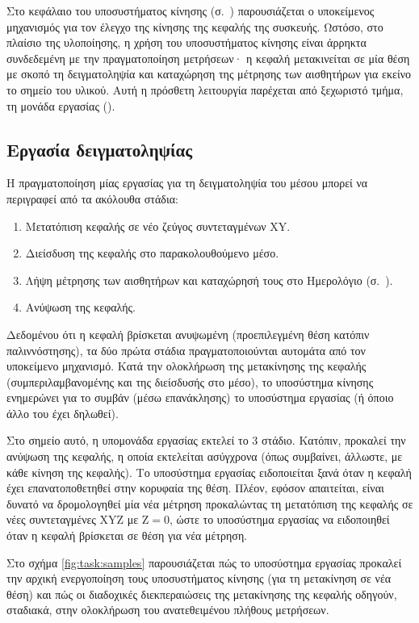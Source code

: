 Στο κεφάλαιο του υποσυστήματος κίνησης (σ.~\pageref{ch:motor})
παρουσιάζεται ο υποκείμενος μηχανισμός για τον έλεγχο της κίνησης της κεφαλής
της συσκευής.
Ωστόσο, στο πλαίσιο της υλοποίησης, η χρήση του υποσυστήματος κίνησης είναι
άρρηκτα συνδεδεμένη με την πραγματοποίηση μετρήσεων· η κεφαλή μετακινείται σε
μία
θέση με σκοπό τη δειγματοληψία και καταχώρηση της μέτρησης των αισθητήρων για
εκείνο το σημείο του υλικού. Αυτή η πρόσθετη λειτουργία παρέχεται από ξεχωριστό
τμήμα, τη μονάδα εργασίας ().


\subsection{Εργασία δειγματοληψίας}

Η πραγματοποίηση μίας εργασίας για τη δειγματοληψία του μέσου μπορεί να
περιγραφεί από τα ακόλουθα στάδια:
\begin{enumerate}
    \item Μετατόπιση κεφαλής σε νέο ζεύγος συντεταγμένων XY.
    \item Διείσδυση της κεφαλής στο παρακολουθούμενο μέσο.
    \item Λήψη μέτρησης των αισθητήρων και καταχώρησή τους στο Ημερολόγιο
    (σ.~\pageref{sec:log}).
    \item Ανύψωση της κεφαλής.
\end{enumerate}

Δεδομένου ότι η κεφαλή βρίσκεται ανυψωμένη (προεπιλεγμένη θέση κατόπιν
παλιννόστησης), %
τα δύο πρώτα στάδια πραγματοποιούνται αυτομάτα από τον
υποκείμενο μηχανισμό. Κατά την ολοκλήρωση της μετακίνησης της κεφαλής
(συμπεριλαμβανομένης και της διείσδυσής στο μέσο), το υποσύστημα κίνησης
ενημερώνει για το συμβάν (μέσω επανάκλησης) το υποσύστημα εργασίας (ή όποιο άλλο
του έχει δηλωθεί).

Στο σημείο αυτό, η υπομονάδα εργασίας εκτελεί το 3 στάδιο. Κατόπιν,
προκαλεί την ανύψωση της κεφαλής, η οποία εκτελείται ασύγχρονα (όπως συμβαίνει,
άλλωστε, με κάθε κίνηση της κεφαλής). Το υποσύστημα εργασίας ειδοποιείται ξανά
όταν η κεφαλή έχει επανατοποθετηθεί στην κορυφαία της θέση. Πλέον, εφόσον
απαιτείται, είναι δυνατό να δρομολογηθεί μία νέα μέτρηση προκαλώντας τη
μετατόπιση της κεφαλής σε νέες συντεταγμένες XYZ με $\text{Z} = 0$, ώστε το
υποσύστημα εργασίας να ειδοποιηθεί όταν η κεφαλή βρίσκεται σε θέση για νέα
μέτρηση.

Στο σχήμα \ref{fig:task:samples} παρουσιάζεται πώς το υποσύστημα εργασίας
προκαλεί την αρχική ενεργοποίηση τους υποσυστήματος κίνησης (για τη μετακίνηση
σε νέα θέση) και πώς οι διαδοχικές διεκπεραιώσεις της μετακίνησης της κεφαλής
οδηγούν, σταδιακά, στην ολοκλήρωση του ανατεθειμένου πλήθους μετρήσεων.


